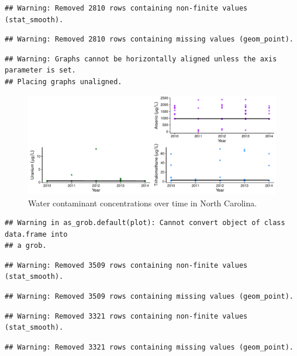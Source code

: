 \documentclass[12pt,]{article}
\begin{document}
\begin{verbatim}
## Warning: Removed 2810 rows containing non-finite values (stat_smooth).
\end{verbatim}

\begin{verbatim}
## Warning: Removed 2810 rows containing missing values (geom_point).
\end{verbatim}

\begin{verbatim}
## Warning: Graphs cannot be horizontally aligned unless the axis parameter is set.
## Placing graphs unaligned.
\end{verbatim}

\begin{figure}
\centering
\includegraphics{Project_Template_files/figure-latex/figs5-1.pdf}
\caption{Water contaminant concentrations over time in North Carolina.}
\end{figure}

\begin{verbatim}
## Warning in as_grob.default(plot): Cannot convert object of class data.frame into
## a grob.
\end{verbatim}

\begin{verbatim}
## Warning: Removed 3509 rows containing non-finite values (stat_smooth).
\end{verbatim}

\begin{verbatim}
## Warning: Removed 3509 rows containing missing values (geom_point).
\end{verbatim}

\begin{verbatim}
## Warning: Removed 3321 rows containing non-finite values (stat_smooth).
\end{verbatim}

\begin{verbatim}
## Warning: Removed 3321 rows containing missing values (geom_point).
\end{verbatim}
\end{document}
